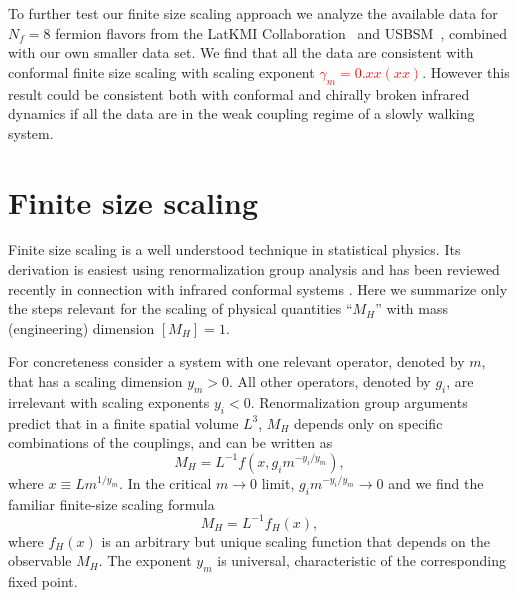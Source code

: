 \documentclass[prl, letterpaper, amsmath, amssymb, preprintnumbers, showpacs, superscriptaddress, twocolumn]{revtex4-1}
\newcommand{\ga}{\ensuremath{\gamma} }
\newcommand{\TODO}[1]{\textcolor{red}{{\bf #1}}}
\begin{document}
To further test our finite size scaling approach we analyze the available data for $N_f=8$ fermion flavors from the LatKMI Collaboration~\cite{Aoki:2013xza} and USBSM~\cite{Schaich:2013eba}, combined with our own smaller data set.
We find that all the data are consistent with conformal finite size scaling with scaling exponent \TODO{$\ga_m = 0.xx(xx)$}.
However this result could be consistent both with conformal and chirally broken infrared dynamics if all the data are in the weak coupling regime of a slowly walking system.




\section{Finite size scaling} %
Finite size scaling is a well understood technique in statistical physics.
Its derivation is easiest using renormalization group analysis and has been reviewed recently in connection with infrared conformal systems \cite{DeGrand:2009mt, DelDebbio:2010ze, DelDebbio:2013qta}.
Here we summarize only the steps relevant for the scaling of physical quantities ``$M_H$'' with mass (engineering) dimension $[M_H] = 1$.

For concreteness consider a system with one relevant operator, denoted by $m$, that has a scaling dimension $y_m > 0$.
All other operators, denoted by $g_i$, are irrelevant with scaling exponents $y_i < 0$.
Renormalization group arguments predict that in a finite spatial volume $L^3$, $M_H$ depends only on specific combinations of the couplings, and can be written as
\begin{equation}
  M_H = L^{-1} f\left(x, g_i m^{-y_i / y_m}\right),
\end{equation}
where $x \equiv L m^{1 / y_m}$.
In the critical $m\to 0$ limit, $g_i m^{-y_i / y_m} \to 0$ and we find the familiar finite-size scaling formula
\begin{equation}
  \label{eq:leading_fss}
  M_H = L^{-1} f_H(x),
\end{equation}
where $f_H(x)$ is an arbitrary but unique scaling function that depends on the observable $M_H$.
The exponent $y_m$ is universal, characteristic of the corresponding fixed point.
\end{document}
